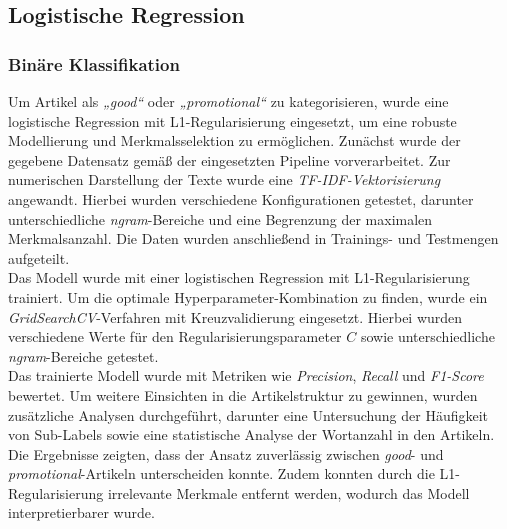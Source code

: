 \subsection{Logistische Regression}
\label{Logistische Regression}
\subsubsection{Binäre Klassifikation}
Um Artikel als \textit{„good“} oder \textit{„promotional“} zu kategorisieren, wurde eine logistische Regression mit L1-Regularisierung eingesetzt, um eine robuste Modellierung und Merkmalsselektion zu ermöglichen. Zunächst wurde der gegebene Datensatz gemäß der eingesetzten Pipeline vorverarbeitet. Zur numerischen Darstellung der Texte wurde eine \textit{TF-IDF-Vektorisierung} angewandt. Hierbei wurden verschiedene Konfigurationen getestet, darunter unterschiedliche \textit{ngram}-Bereiche und eine Begrenzung der maximalen Merkmalsanzahl. Die Daten wurden anschließend in Trainings- und Testmengen aufgeteilt.\\
Das Modell wurde mit einer logistischen Regression mit L1-Regularisierung trainiert. Um die optimale Hyperparameter-Kombination zu finden, wurde ein \textit{GridSearchCV}-Verfahren mit Kreuzvalidierung eingesetzt. Hierbei wurden verschiedene Werte für den Regularisierungsparameter \(C\) sowie unterschiedliche \textit{ngram}-Bereiche getestet. \\
Das trainierte Modell wurde mit Metriken wie \textit{Precision}, \textit{Recall} und \textit{F1-Score} bewertet. Um weitere Einsichten in die Artikelstruktur zu gewinnen, wurden zusätzliche Analysen durchgeführt, darunter eine Untersuchung der Häufigkeit von Sub-Labels sowie eine statistische Analyse der Wortanzahl in den Artikeln.\\
Die Ergebnisse zeigten, dass der Ansatz zuverlässig zwischen \textit{good}- und \textit{promotional}-Artikeln unterscheiden konnte. Zudem konnten durch die L1-Regularisierung irrelevante Merkmale entfernt werden, wodurch das Modell interpretierbarer wurde.
